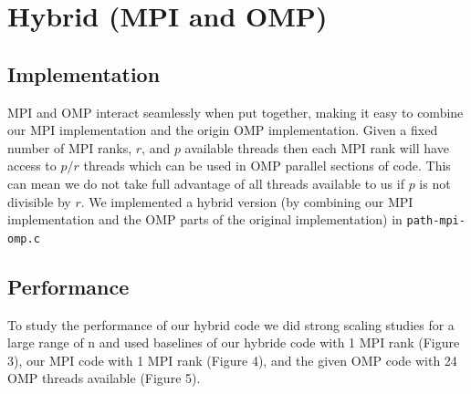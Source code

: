 \section{Hybrid (MPI and OMP)}\label{sec:hybrid}
\subsection{Implementation}
MPI and OMP interact seamlessly when put together, making it easy to combine
our MPI implementation and the origin OMP implementation. Given a fixed number
of MPI ranks, $r$, and $p$ available threads then each MPI rank will have
access to $p/r$ threads which can be used in OMP parallel sections of code.
This can mean we do not take full advantage of all threads available to us if
$p$ is not divisible by $r$. We implemented a hybrid version (by combining our
MPI implementation and the OMP parts of the original implementation) in
\texttt{path-mpi-omp.c}

\subsection{Performance}
To study the performance of our hybrid code we did strong scaling studies for a
large range of n and used baselines of our hybride code with 1 MPI rank (Figure
3), our MPI code with 1 MPI rank (Figure 4), and the given OMP code with 24 OMP
threads available (Figure 5).

